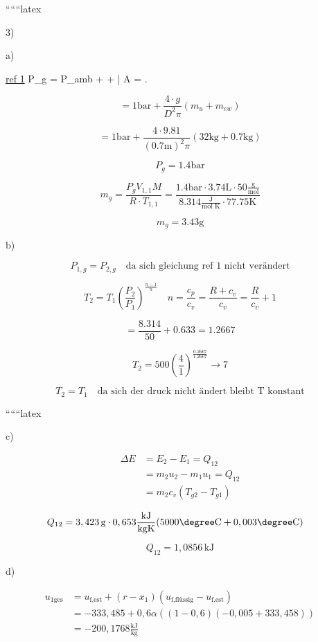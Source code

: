 
``````latex


3) 

a) 

\underline{ref 1} \quad P_g = P_{amb} +  +  \quad \left| A =  \right.

\[
= 1 \text{bar} + \frac{4 \cdot g}{D^2 \pi} (m_u + m_{ew})
\]

\[
= 1 \text{bar} + \frac{4 \cdot 9.81}{(0.7 \text{m})^2 \pi} \left(32 \text{kg} + 0.7 \text{kg}\right)
\]

\[
P_g = \boxed{1.4 \text{bar}}
\]

\[
m_g = \frac{P_g V_{1,1} M}{R \cdot T_{1,1}} = \frac{1.4 \text{bar} \cdot 3.74 \text{L} \cdot 50 \frac{\text{g}}{\text{mol}}}{8.314 \frac{\text{J}}{\text{mol K}} \cdot 77.75 \text{K}}
\]

\[
m_g = \boxed{3.43 \text{g}}
\]

b) 

\[
P_{1,g} = P_{2,g} \quad \text{da sich gleichung ref 1 nicht verändert}
\]

\[
T_2 = T_1 \left( \frac{P_2}{P_1} \right)^{\frac{n-1}{n}} \quad n = \frac{c_p}{c_v} = \frac{R + c_v}{c_v} = \frac{R}{c_v} + 1
\]

\[
= \frac{8.314}{50} + 0.633 = 1.2667
\]

\[
T_2 = 500 \left( \frac{4}{1} \right)^{\frac{0.2667}{1.2667}} \rightarrow 7
\]

\[
T_2 = T_1 \quad \text{da sich der druck nicht ändert bleibt T konstant}
\]

``````latex

c)

\begin{align*}
\Delta E &= E_2 - E_1 = Q_{12} \\
&= m_2 u_2 - m_1 u_1 = Q_{12} \\
&= m_2 c_v (T_{g2} - T_{g1})
\end{align*}

\begin{align*}
Q_{12} &= 3,423 \, \text{g} \cdot 0,653 \frac{\text{kJ}}{\text{kgK}} (5000 \degree \text{C} + 0,003 \degree \text{C})
\end{align*}

\[
Q_{12} = 1,0856 \, \text{kJ}
\]

d)

\begin{align*}
u_{1\text{ges}} &= u_{\text{f,est}} + (r-x_1) (u_{\text{f,flüssig}} - u_{\text{f,est}}) \\
&= -333,485 + 0,6 \alpha \left( (1-0,6) (-0,005 + 333,458) \right) \\
&= -200,1768 \frac{\text{kJ}}{\text{kg}}
\end{align*}

